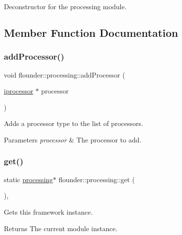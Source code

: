 Deconstructor for the processing module. 



\subsection{Member Function Documentation}
\mbox{\label{classflounder_1_1processing_a9ae5080b9ed1099aae8db7db034c9eee}} 
\subsubsection{\texorpdfstring{add\+Processor()}{addProcessor()}}
{\footnotesize\ttfamily void flounder\+::processing\+::add\+Processor (\begin{DoxyParamCaption}\item[{\hyperlink{classflounder_1_1iprocessor}{iprocessor} $\ast$}]{processor }\end{DoxyParamCaption})}



Adds a processor type to the list of processors. 


\begin{DoxyParams}{Parameters}
{\em processor} & The processor to add. \\
\hline
\end{DoxyParams}
\mbox{\label{classflounder_1_1processing_a9d533a541a2a514d201ff2c37782d44d}} 
\subsubsection{\texorpdfstring{get()}{get()}}
{\footnotesize\ttfamily static \hyperlink{classflounder_1_1processing}{processing}$\ast$ flounder\+::processing\+::get (\begin{DoxyParamCaption}{ }\end{DoxyParamCaption})\hspace{0.3cm}{\ttfamily [inline]}, {\ttfamily [static]}}



Gets this framework instance. 

\begin{DoxyReturn}{Returns}
The current module instance. 
\end{DoxyReturn}
\mbox{\label{classflounder_1_1processing_addb84aad44d50ae3fa9513cddcea9968}} 
